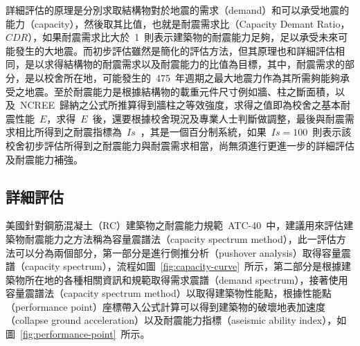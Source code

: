 詳細評估的原理是分別求取結構物對於地震的需求（demand）和可以承受地震的能力（capacity），然後取其比值，也就是耐震需求比（Capacity Demant Ratio，$CDR$），如果耐震需求比大於~1~則表示建築物的耐震能力足夠，足以承受未來可能發生的大地震。而初步評估雖然是簡化的評估方法，但其原理也和詳細評估相同，是以求得結構物的耐震需求以及耐震能力的比值為目標，其中，耐震需求的部分，是以校舍所在地，可能發生的~475~年週期之最大地震力作為其所需夠能夠承受之地震。至於耐震能力是根據結構物的載重元件尺寸例如牆、柱之斷面積，以及~NCREE~歸納之公式所推算得到牆柱之等效強度，求得之值即為校舍之基本耐震性能~$E$，求得~$E$~後，還要根據校舍現況及專業人士判斷做調整，最後與耐震需求相比所得到之耐震指標為~$Is$~，其是一個百分制系統，如果~$Is = 100$~則表示該校舍初步評估所得到之耐震能力與耐震需求相當，尚無須進行更進一步的詳細評估及耐震能力補強。




\subsection{詳細評估}

美國針對鋼筋混凝土（RC）建築物之耐震能力規範~ATC-40\cite{applied1996seismic}~中，建議用來評估建築物耐震能力之方法稱為容量震譜法（capacity spectrum method），此一評估方法可以分為兩個部分，第一部分是進行側推分析（pushover analysis）取得容量震譜（capacity spectrum），流程如圖~\ref{fig:capacity-curve}~所示，第二部分是根據建築物所在地的各種相關資訊和規範取得需求震譜（demand spectrum），接著使用容量震譜法（capacity spectrum method）以取得建築物性能點，根據性能點（performance point）座標帶入公式計算可以得到建築物的破壞地表加速度（collapse ground acceleration）以及耐震能力指標（aseismic ability index），如圖~\ref{fig:performance-point}~所示。

